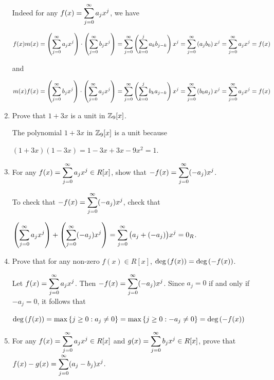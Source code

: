 \documentclass[11pt,fleqn,dvipsnames,usenames]{article}
\begin{document}
\begin{enumerate}[1.]
Indeed for any $f(x) = \displaystyle\sum\limits_{j=0}^{\infty}a_{j}x^{j}$, we have
\begin{center}
$f(x)m(x) = \left(\displaystyle\sum\limits_{j=0}^{\infty}a_{j}x^{j}\right) \cdot \left(\displaystyle\sum\limits_{j=0}^{\infty}b_{j}x^{j}\right) = \displaystyle\sum\limits_{j=0}^{\infty}\left(\displaystyle\sum\limits_{k=0}^{j}a_{k}b_{j-k}\right)x^{j} = \displaystyle\sum\limits_{j=0}^{\infty}\left(a_{j}b_{0}\right)x^{j} = \displaystyle\sum\limits_{j=0}^{\infty}a_{j}x^{j} = f(x)$
\end{center}
and
\begin{center}
$m(x)f(x) = \left(\displaystyle\sum\limits_{j=0}^{\infty}b_{j}x^{j}\right) \cdot \left(\displaystyle\sum\limits_{j=0}^{\infty}a_{j}x^{j}\right) = \displaystyle\sum\limits_{j=0}^{\infty}\left(\displaystyle\sum\limits_{k=0}^{j}b_{k}a_{j-k}\right)x^{j} = \displaystyle\sum\limits_{j=0}^{\infty}\left(b_{0}a_{j}\right)x^{j} = \displaystyle\sum\limits_{j=0}^{\infty}a_{j}x^{j} = f(x)$
\end{center}

\item Prove that $1+3x$ is a unit in $\mathbb{Z}_{9}[x]$.
\vsmsp

\solution The polynomial $1 + 3x$ in $\mathbb{Z}_9[x]$ is a unit because
\begin{center}
$(1 + 3x)(1 - 3x) = 1 - 3x + 3x - 9x^2 = 1$.
\end{center}

\item For any $f(x)=\displaystyle\sum\limits_{j=0}^{\infty}a_{j}x^{j}\in R[x]$, show that $-f(x) = \displaystyle\sum\limits_{j=0}^{\infty}(-a_{j})x^{j}$.
\vsmsp

\solution To check that $-f(x) = \displaystyle\sum\limits_{j=0}^{\infty}(-a_{j})x^{j}$, check that
\begin{center}
$\left(\displaystyle\sum\limits_{j=0}^{\infty}a_{j}x^{j}\right) + \left(\displaystyle\sum\limits_{j=0}^{\infty}(-a_{j})x^{j}\right) = \displaystyle\sum\limits_{j=0}^{\infty}\big(a_{j} + (-a_{j})\big)x^{j} = 0_{R}$.
\end{center}

\item Prove that for any non-zero $f(x)\in R[x]$, $\text{deg}\left(f(x)\right) = \text{deg}\left(-f(x)\right)$.
\vsmsp

\solution Let $f(x) = \displaystyle\sum\limits_{j=0}^{\infty}a_{j}x^{j}$.  Then $-f(x) = \displaystyle\sum\limits_{j=0}^{\infty}(-a_{j})x^{j}$.  Since $a_{j} = 0$ if and only if $-a_{j} = 0$, it follows that
\begin{center}
$\text{deg}\left(f(x)\right) = \max\left\{j\geq 0:a_{j}\neq 0\right\} = \max\left\{j\geq 0:-a_{j}\neq 0\right\} = \text{deg}\left(-f(x)\right)$
\end{center}

\item For any $f(x)=\displaystyle\sum\limits_{j=0}^{\infty}a_{j}x^{j}\in R[x]$ and $g(x)=\displaystyle\sum\limits_{j=0}^{\infty}b_{j}x^{j}\in R[x]$, prove that $f(x) - g(x) = \displaystyle\sum\limits_{j=0}^{\infty}(a_{j}-b_{j})x^{j}$.
\vsmsp


\end{enumerate}
\end{document}

